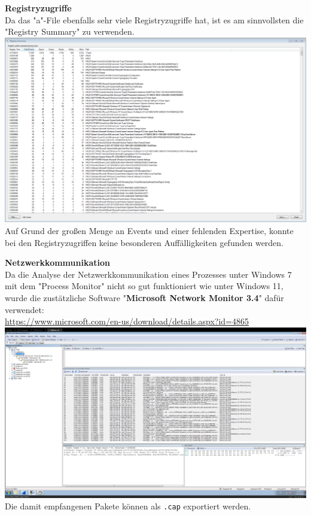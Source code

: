 \documentclass{article}
\begin{document}
	
	\pagebreak
	
	\noindent \textbf{Registryzugriffe}\\
	Da das "a"-File ebenfalls sehr viele Registryzugriffe hat, ist es am sinnvollsten die "Registry Summary" zu verwenden.\\
	\includegraphics[width=1\linewidth]{"pictures/2.3 Registry Summary"}\\
	Auf Grund der großen Menge an Events und einer fehlenden Expertise, konnte bei den Registryzugriffen keine besonderen Auffälligkeiten gefunden werden.\\
	
	\pagebreak
	
	\noindent \textbf{Netzwerkkommunikation}\\
	Da die Analyse der Netzwerkkommunikation eines Prozesses unter Windows 7 mit dem "Process Monitor" nicht so gut funktioniert wie unter Windows 11, wurde die zustätzliche Software "\textbf{Microsoft Network Monitor 3.4}" dafür verwendet:\\
	\url{https://www.microsoft.com/en-us/download/details.aspx?id=4865}\\
	\includegraphics[width=1\linewidth]{"pictures/2.4 Network Monitor"}\\
	Die damit empfangenen Pakete können als \texttt{.cap} exportiert werden.\\
\end{document}
